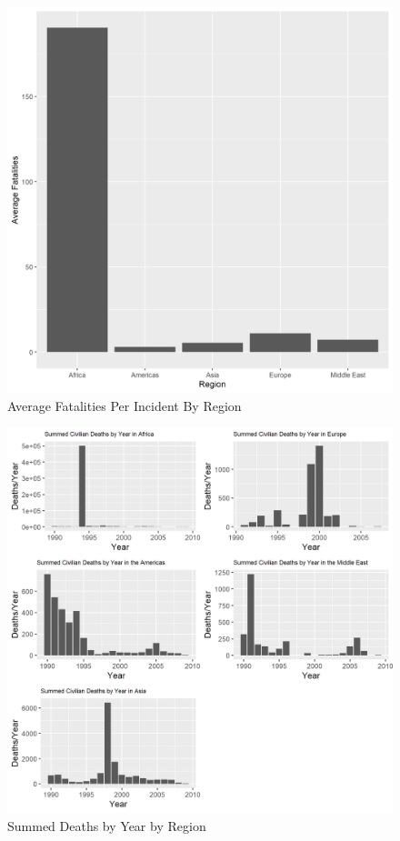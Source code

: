 \begin{figure}
  \includegraphics[scale=.8]{fig1_avgfatplot}
  \caption{Average Fatalities Per Incident By Region}
\end{figure} 
\begin{figure}
  \includegraphics[scale=.9]{fig2}
  \caption{Summed Deaths by Year by Region}
\end{figure} 

